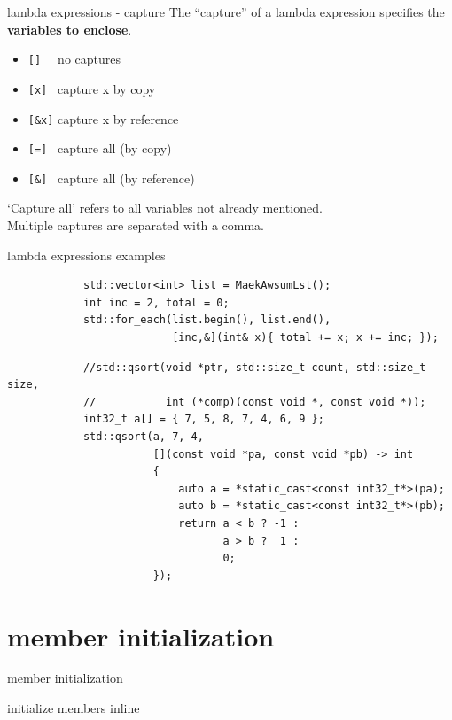 	\begin{frame}[fragile]{lambda expressions - capture}
		The ``capture'' of a lambda expression specifies the \textbf{variables to enclose}.
		
		\begin{itemize}
			\item \lstinline|[]  | no captures
			\item \lstinline|[x] | capture x by copy
			\item \lstinline|[&x]| capture x by reference
			\item \lstinline|[=] | capture all (by copy)
			\item \lstinline|[&] | capture all (by reference)
		\end{itemize}
		
		\pause
		
		\emptyline
		`Capture all' refers to all variables not already mentioned. \\
		Multiple captures are separated with a comma.
		
		\emptyline
	\end{frame}
	
	\begin{frame}[fragile]{lambda expressions examples}
		\begin{lstlisting}
			std::vector<int> list = MaekAwsumLst();
			int inc = 2, total = 0;
			std::for_each(list.begin(), list.end(),
			              [inc,&](int& x){ total += x; x += inc; });
		\end{lstlisting}
		
		\pause
		
		\begin{lstlisting}
			//std::qsort(void *ptr, std::size_t count, std::size_t size,
			//           int (*comp)(const void *, const void *));
			int32_t a[] = { 7, 5, 8, 7, 4, 6, 9 };
			std::qsort(a, 7, 4,
			           [](const void *pa, const void *pb) -> int
			           {
			               auto a = *static_cast<const int32_t*>(pa);
			               auto b = *static_cast<const int32_t*>(pb);
			               return a < b ? -1 :
			                      a > b ?  1 :
			                      0;
			           });
		\end{lstlisting}
	\end{frame}
	
	\section{member initialization}
	\begin{frame}
		\begin{center}
			{\Huge member initialization}
			
			\emptyline
			{\Large initialize members inline}
		\end{center}
	\end{frame}
	
